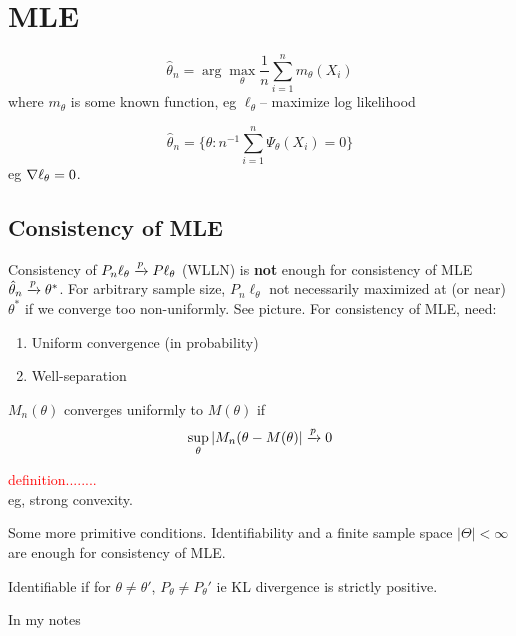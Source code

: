 \documentclass{article}
\newcommand\myworries[1]{\textcolor{red}{#1}}
\begin{document}
\section{MLE}
\begin{definition}[M-estimators]
$$\hat \theta_n = \arg \max_\theta \frac{1}{n} \sum_{i=1}^n m_\theta(X_i)$$
where $m_\theta$ is some known function, eg $\ell_\theta$-- maximize log likelihood 

\end{definition}
\begin{definition}[Z-estimator]
$$\hat \theta _n = \{\theta: n^{-1} \sum_{i=1}^n \Psi_\theta(X_i) = 0\}$$
eg $\nabla \ell_\theta = 0$. 
\end{definition}
\subsection{Consistency of MLE}
Consistency of $P_n \ell_\theta \xrightarrow{p} P \ell_\theta $ (WLLN) is \textbf{not} enough for consistency of MLE $\hat \theta_n \xrightarrow{p} \theta^*$. For arbitrary sample size, $P_n \ell_\theta$ not necessarily maximized at (or near) $\theta^*$ if we converge too non-uniformly. See picture.  For consistency of MLE, need:
\begin{enumerate}
	\item Uniform convergence (in probability)
	\item Well-separation 
\end{enumerate}
\begin{definition}
$M_n(\theta)$ converges uniformly to $M(\theta)$ if 
$$\sup_{\theta} |M_n(\theta - M(\theta)| \xrightarrow{p} 0$$
\end{definition}
\begin{definition}
\myworries{definition........}\\
eg, strong convexity. 
\end{definition}
Some more primitive conditions. Identifiability and a finite sample space $|\Theta|<\infty$ are enough for consistency of MLE. 
\begin{definition}[Identifiability]
Identifiable if for $\theta \neq \theta'$, $P_\theta \neq P_\theta'$ ie KL divergence is strictly positive. 
\end{definition}
\begin{example}
In my notes
\end{example}
\end{document}
